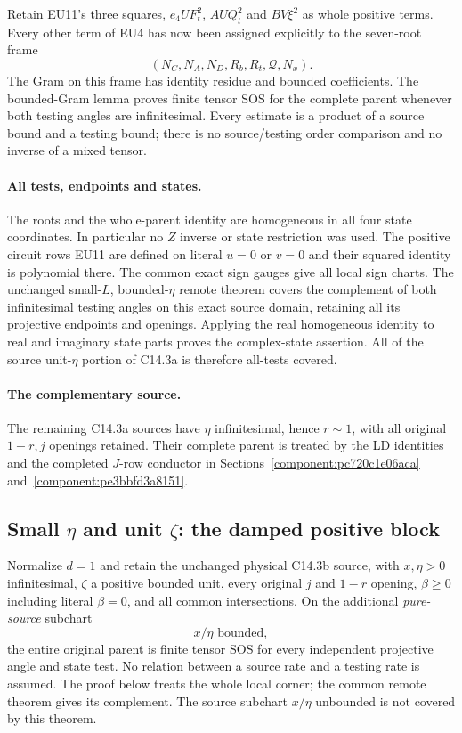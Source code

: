 Retain EU11's three squares, $e_4UF_t^2$, $AUQ_t^2$ and
$BV\xi^2$ as whole positive terms. Every other term of EU4 has now
been assigned explicitly to the seven-root frame
\[
                 (N_C,N_A,N_D,R_b,R_t,\mathcal Q,N_x).             \tag{EU12}
\]
The Gram on this frame has identity residue and bounded coefficients.
The bounded-Gram lemma proves finite tensor SOS for the complete
parent whenever both testing angles are infinitesimal. Every estimate
is a product of a source bound and a testing bound; there is no
source/testing order comparison and no inverse of a mixed tensor.

\paragraph{All tests, endpoints and states.}
The roots and the whole-parent identity are homogeneous in all four
state coordinates. In particular no $Z$ inverse or state restriction
was used. The positive circuit rows EU11 are defined on literal
$u=0$ or $v=0$ and their squared identity is polynomial there.
The common exact sign gauges give all local sign charts.
The unchanged small-$L$, bounded-$\eta$ remote theorem covers the
complement of both infinitesimal testing angles on this exact source
domain, retaining all its projective endpoints and openings.
Applying the real homogeneous identity to real and imaginary state
parts proves the complex-state assertion. All of the source unit-$\eta$
portion of C14.3a is therefore all-tests covered.

\paragraph{The complementary source.}
The remaining C14.3a sources have $\eta$ infinitesimal, hence $r\sim1$, with all original $1-r,j$ openings retained. Their complete parent is treated by the LD identities and the completed $J$-row conductor in Sections~\ref{component:pc720c1e06aca} and~\ref{component:pe3bbfd3a8151}.



\subsection{Small $\eta$ and unit $\zeta$: the damped positive block}

\label{component:p024c821bfb59}

\begin{theorem}
Normalize $d=1$ and retain the unchanged physical C14.3b source, with $x,\eta>0$
infinitesimal, $\zeta$ a positive bounded unit, every original $j$
and $1-r$ opening, $\beta\ge0$ including literal $\beta=0$, and all common intersections.
On the additional \emph{pure-source} subchart
\[
                         x/\eta\text{ bounded},              \tag{DG1}
\]
the entire original parent is finite tensor SOS for every independent
projective angle and state test. No relation between a source rate
and a testing rate is assumed. The proof below treats the whole local
corner; the common remote theorem gives its complement. The source
subchart $x/\eta$ unbounded is not covered by this theorem.
\end{theorem}


